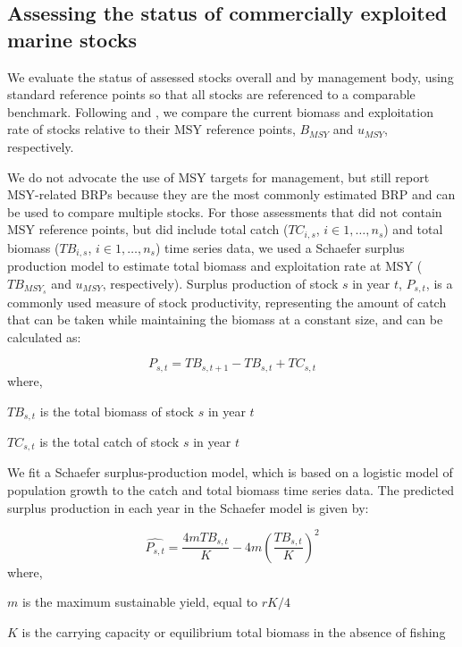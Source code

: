 \documentclass[letterpaper,review,authoryear,12pt]{elsarticle}
\begin{document}
\subsection*{Assessing the status of commercially exploited marine stocks}
We evaluate the status of assessed stocks overall and by management
body, using standard reference points so that all
stocks are referenced to a comparable benchmark.  Following
\cite{Froese:Proelss:2010:fandf} and \cite{Worm:etal:2009:science}, we
compare the current biomass and exploitation rate of stocks relative
to their MSY reference points, $B_{MSY}$ and $u_{MSY}$, respectively. 

We do not advocate the use of MSY targets for management, but still
report MSY-related BRPs because they are the most commonly estimated BRP and can be used to compare multiple
stocks.  For those assessments that did not contain MSY reference
points, but did include total catch ($TC_{i,s}$, $i \in
{1,\ldots,n_{s}}$) and total biomass ($TB_{i,s}$, $i \in
{1,\ldots,n_{s}}$) time series data, we used a Schaefer surplus
production model to estimate total biomass and exploitation rate at
MSY ($TB_{MSY_{s}}$ and $u_{MSY}$, respectively). Surplus production
of stock $s$ in year $t$, $P_{s,t}$, is a commonly used measure of
stock productivity, representing the amount of catch that can be taken while maintaining the biomass at a constant size, and can be calculated as:

\begin{equation}
P_{s,t}  = TB_{s,t+1} - TB_{s,t} + TC_{s,t}
\end{equation}
where,
\begin{description}
\item $TB_{s,t}$ is the total biomass of stock $s$ in year $t$
\item $TC_{s,t}$ is the total catch of stock $s$ in year $t$
\end{description}

We fit a Schaefer surplus-production model, which is based on a logistic model of population
growth to the catch and total biomass time series data. The predicted surplus production in each
year in the Schaefer model is given by:

\begin{equation}
\hat{P_{s,t}} = \frac{4mTB_{s,t}}{K} - 4m\left(\frac{TB_{s,t}}{K} \right)^{2}
\end{equation}
where,
\begin{description}
\item $m$ is the maximum sustainable yield, equal to $rK/4$
\item $K$ is the carrying capacity or equilibrium total biomass in the absence of fishing \citep{Hilborn:Walters:1992}
\end{description}
\end{document}
